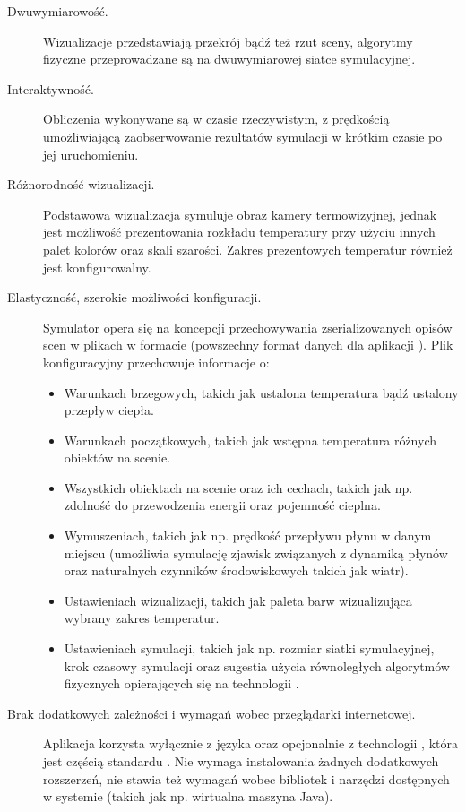 \begin{description}

\item[Dwuwymiarowość.] Wizualizacje przedstawiają przekrój bądź też rzut sceny,
algorytmy fizyczne przeprowadzane są na dwuwymiarowej siatce symulacyjnej.

\item[Interaktywność.] Obliczenia wykonywane są w czasie rzeczywistym,
z prędkością umożliwiającą zaobserwowanie rezultatów symulacji w krótkim
czasie po jej uruchomieniu.  

\item[Różnorodność wizualizacji.] Podstawowa wizualizacja symuluje obraz
kamery termowizyjnej, jednak jest możliwość prezentowania rozkładu temperatury
przy użyciu innych palet kolorów oraz skali szarości. Zakres prezentowych
temperatur również jest konfigurowalny.

\item[Elastyczność, szerokie możliwości konfiguracji.] Symulator opera się na
koncepcji przechowywania zserializowanych opisów scen w plikach w formacie
 (powszechny format danych dla aplikacji \js). Plik konfiguracyjny
przechowuje informacje o:
\begin{itemize}

\item Warunkach brzegowych, takich jak ustalona temperatura bądź ustalony
przepływ ciepła.

\item Warunkach początkowych, takich jak wstępna temperatura różnych obiektów
na scenie.

\item Wszystkich obiektach na scenie oraz ich cechach, takich jak np. zdolność
do przewodzenia energii oraz pojemność cieplna.

\item Wymuszeniach, takich jak np. prędkość przepływu płynu w danym miejscu
(umożliwia symulację zjawisk związanych z dynamiką płynów oraz naturalnych
czynników środowiskowych takich jak wiatr).

\item Ustawieniach wizualizacji, takich jak paleta barw wizualizująca
wybrany zakres temperatur.

\item Ustawieniach symulacji, takich jak np. rozmiar siatki symulacyjnej, krok
czasowy symulacji oraz sugestia użycia równoległych algorytmów fizycznych
opierających się na technologii .

\end{itemize} 

\item[Brak dodatkowych zależności i wymagań wobec przeglądarki internetowej.]
Aplikacja korzysta wyłącznie z języka \js oraz opcjonalnie z technologii
, która jest częścią standardu . Nie wymaga instalowania
żadnych dodatkowych rozszerzeń, nie stawia też wymagań wobec bibliotek i
narzędzi dostępnych w systemie (takich jak np. wirtualna maszyna Java).

\end{description}

